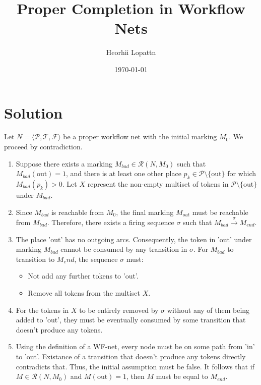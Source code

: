 \documentclass[12pt]{article}
\title{Proper Completion in Workflow Nets}
\author{Heorhii Lopattn}
\date{\today}
\begin{document}
\newcommand{\fire}[1]{\xrightarrow{#1}}
\newcommand{\firee}[1]{\,[#1\rangle} %
\newcommand{\marking}[1]{\mathbf{#1}} %
\newcommand{\placeset}{\mathcal{P}}
\newcommand{\transitionset}{\mathcal{T}}
\newcommand{\flowrel}{\mathcal{F}}
\newcommand{\reachable}[2]{\mathcal{R}(#1, #2)}

\maketitle



\section*{Solution}
Let $N=\langle \placeset, \transitionset, \flowrel \rangle$ be a proper workflow net with the initial marking $M_0$.
We proceed by contradiction.
\begin{enumerate}
    \item  Suppose  there exists a marking $M_{bad} \in \reachable{N}{M_0}$ such that $M_{bad}(\text{out})=1$, and there is at least one other place $p_k \in \placeset \setminus \{\text{out}\}$ for which $M_{bad}(p_k) > 0$. Let $X$ represent the non-empty multiset of tokens in $\placeset \setminus \{\text{out}\}$ under $M_{bad}$.

    \item Since $M_{bad}$ is reachable from $M_0$, the final marking $M_{out}$ must be reachable from $M_{bad}$. Therefore, there exists a firing sequence $\sigma$ such that $M_{bad} \fire{\sigma} M_{end}$.

    \item The place 'out' has no outgoing arcs. Consequently, the token in 'out' under marking $M_{bad}$ cannot be consumed by any transition in $\sigma$. For $M_{bad}$ to transition to $M_end$, the sequence $\sigma$ must:
    \begin{itemize}
        \item Not add any further tokens to 'out'.
        \item Remove all tokens from the multiset $X$.
    \end{itemize}

    \item  For the tokens in $X$ to be entirely removed by $\sigma$ without any of them being added to 'out', they must be eventually consumed by some transition that doesn't produce any tokens.
    \item  Using the definition of a WF-net, every node must be on some path from  'in' to  'out'. Existance of a transition that doesn't produce any tokens directly contradicts that.
    Thus, the initial assumption must be false. It follows that if $M \in \reachable{N}{M_0}$ and $M(\text{out})=1$, then $M$ must be equal to $M_{end}$.
\end{enumerate}
\end{document}
